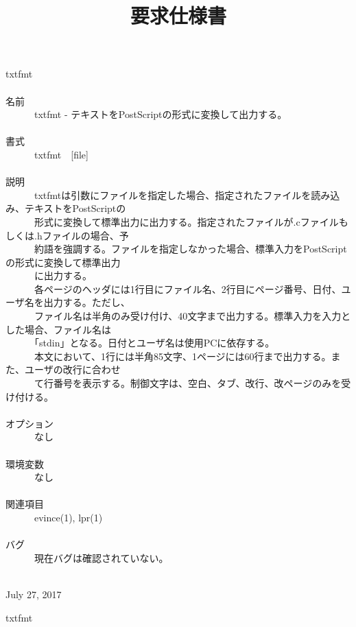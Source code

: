 \documentclass[]{jsarticle}
\title{要求仕様書}
\author{}
\date{}
\begin{document}
\noindent
txtfmt\\\\
名前\\
　　　txtfmt - テキストをPostScriptの形式に変換して出力する。\\\\
書式\\
　　　txtfmt　[file]\\\\
説明\\
　　　txtfmtは引数にファイルを指定した場合、指定されたファイルを読み込み、テキストをPostScriptの\\
　　　形式に変換して標準出力に出力する。指定されたファイルが.cファイルもしくは.hファイルの場合、予\\
　　　約語を強調する。ファイルを指定しなかった場合、標準入力をPostScriptの形式に変換して標準出力\\
　　　に出力する。\\
　　　各ページのヘッダには1行目にファイル名、2行目にページ番号、日付、ユーザ名を出力する。ただし、\\
　　　ファイル名は半角のみ受け付け、40文字まで出力する。標準入力を入力とした場合、ファイル名は\\
　　　「stdin」となる。日付とユーザ名は使用PCに依存する。\\
　　　本文において、1行には半角85文字、1ページには60行まで出力する。また、ユーザの改行に合わせ\\
　　　て行番号を表示する。制御文字は、空白、タブ、改行、改ページのみを受け付ける。\\\\
オプション\\
　　　なし\\\\
環境変数\\
　　　なし\\\\
関連項目\\
　　　evince(1), lpr(1)\\\\
バグ\\
　　　現在バグは確認されていない。\\\\
\begin{center}July 27, 2017\end{center}
\begin{flushright}\vspace{-22pt}txtfmt\end{flushright}
\end{document}
